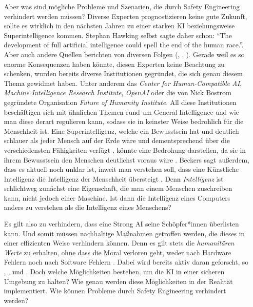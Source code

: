         Aber was sind mögliche Probleme und Szenarien, die durch Safety Engineering verhindert werden müssen? Diverse
        Experten prognostizieren keine gute Zukunft, sollte es wirklich in den nächsten Jahren zu einer starken KI
        beziehungsweise Superintelligence kommen. Stephan Hawking selbst sagte daher schon: ``The development
        of full artificial intelligence could spell the end of the human race.''.\cite{cellan-jones_2014} Aber auch
        andere Quellen berichten von diversen Folgen (\cite[Bostrom]{bostrom_2014}, \cite[Beckers]{Beckers2018},
        \cite[Musk]{hern_2015}). Gerade weil es so enorme Konsequenzen haben könnte, diesen Experten keine Beachtung zu
        schenken, wurden bereits diverse Institutionen gegründet, die sich genau diesem Thema gewidmet haben. Unter anderem
        das \textit{Center for Human-Compatible AI}, \textit{Machine Intelligence Research Institute}, \textit{OpenAI} oder
        die von Nick Bostrom gegründete Organisation \textit{Future of Humanity Institute}. All diese Institutionen
        beschäftigen sich mit ähnlichen Themen rund um General Intelligence und wie man diese derart regulieren kann,
        sodass sie in keinster Weise bedrohlich für die Menschheit ist. Eine Superintelligenz, welche ein Bewusstsein hat
        und deutlich schlauer als jeder Mensch auf der Erde wäre und dementsprechend über die verschiedensten Fähigkeiten
        verfügt \cite{bostrom_2006}, könnte eine Bedrohung darstellen, da sie in ihrem Bewusstsein den Menschen
        deutlichst voraus wäre \cite{Beckers2018}. Beckers sagt außerdem, dass es aktuell noch unklar ist, inweit man
        verstehen soll, dass eine Künstliche Intelligenz die Intelligenz der Menschheit übersteigt \cite[s. 237]{Beckers2018}.
        Denn \textit{Intelligenz} ist schlichtweg zunächst eine Eigenschaft, die man einem Menschen zuschreiben kann,
        nicht jedoch einer Maschine. Ist dann die Intelligenz eines Computers anders zu verstehen als die Intelligenz
        eines Menschens?

        Es gilt also zu verhindern, dass eine Strong AI seine Schöpfer*innen überlisten kann. Und somit müssen nachhaltige
        Maßnahmen getroffen werden, die dieses in einer effizienten Weise verhindern können. Denn es gilt stets die
        \textit{humanitären Werte} zu erhalten, ohne dass die Moral verloren geht, weder nach Hardware Fehlern noch
        nach Software Fehlern \cite[s. 7]{yampolskiy2013safety}. Dabei wird bereits aktiv daran geforscht, so
        \citeauthor*{yampolskiy2013safety}, \citep{gordon1998}, \citep{GordonSpears2003} und \citep{Spears}. Doch welche
        Möglichkeiten bestehen, um die KI in einer sicheren Umgebung zu halten? Wie genau werden diese Möglichkeiten
        in der Realität implementiert. Wie können Probleme durch Safety Engineering verhindert werden?


